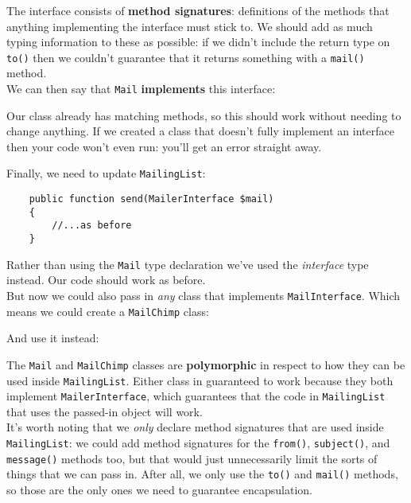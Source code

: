 
The interface consists of \textbf{method signatures}: definitions of the methods that anything implementing the interface must stick to. We should add as much typing information to these as possible: if we didn't include the return type on \texttt{to()} then we couldn't guarantee that it returns something with a \texttt{mail()} method.
\\

We can then say that \texttt{Mail} \textbf{implements} this interface:


Our class already has matching methods, so this should work without needing to change anything. If we created a class that doesn't fully implement an interface then your code won't even run: you'll get an error straight away.


\pagebreak


Finally, we need to update \texttt{MailingList}:

\begin{verbatim}
    public function send(MailerInterface $mail)
    {
        //...as before
    }
\end{verbatim}

Rather than using the \texttt{Mail} type declaration we've used the \textit{interface} type instead. Our code should work as before.
\\

But now we could also pass in \textit{any} class that implements \texttt{MailInterface}. Which means we could create a \texttt{MailChimp} class:


And use it instead:


The \texttt{Mail} and \texttt{MailChimp} classes are \textbf{polymorphic} in respect to how they can be used inside \texttt{MailingList}. Either class in guaranteed to work because they both implement \texttt{MailerInterface}, which guarantees that the code in \texttt{MailingList} that uses the passed-in object will work.
\\

It's worth noting that we \textit{only} declare method signatures that are used inside \texttt{MailingList}: we could add method signatures for the \texttt{from()}, \texttt{subject()}, and \texttt{message()} methods too, but that would just unnecessarily limit the sorts of things that we can pass in. After all, we only use the \texttt{to()} and \texttt{mail()} methods, so those are the only ones we need to guarantee encapsulation.
\\


